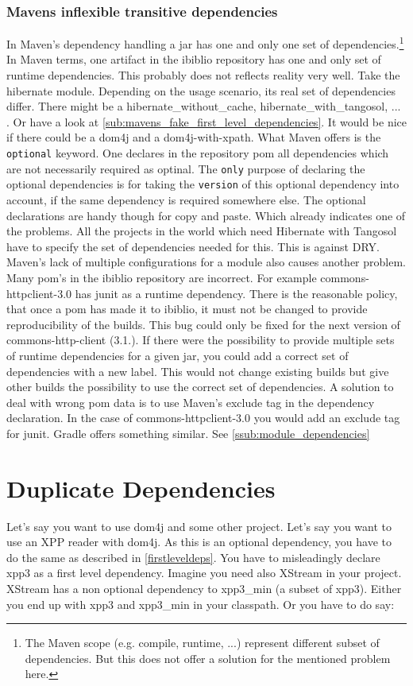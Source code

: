 \subsubsection{Mavens inflexible transitive dependencies}
In Maven’s dependency handling a jar has one and only one set of dependencies.\footnote{The Maven scope (e.g. compile, runtime, ...) represent different subset of dependencies. But this does not offer a solution for the mentioned problem here.} In Maven terms, one artifact in the ibiblio repository has one and only set of runtime dependencies. This probably does not reflects reality very well. Take the hibernate module. Depending on the usage scenario, its real set of dependencies differ. There might be a hibernate\_without\_cache, hibernate\_with\_tangosol, ... . Or have a look at \ref{sub:mavens_fake_first_level_dependencies}. It would be nice if there could be a dom4j and a dom4j-with-xpath. What Maven offers is the \texttt{optional} keyword. One declares in the repository pom all dependencies which are not necessarily required as optinal. The \texttt{only} purpose of declaring the optional dependencies is for taking the \texttt{version} of this optional dependency into account, if the same dependency is required somewhere else. The optional declarations are handy though for copy and paste. Which already indicates one of the problems. All the projects in the world which need Hibernate with Tangosol have to specify the set of dependencies needed for this. This is against DRY. 
Maven's lack of multiple configurations for a module also causes another problem. Many pom's in the ibiblio repository are incorrect. For example commons-httpclient-3.0 has junit as a runtime dependency. There is the reasonable policy, that once a pom has made it to ibiblio, it must not be changed to provide reproducibility of the builds. This bug could only be fixed for the next version of commons-http-client (3.1.). If there were the possibility to provide multiple sets of runtime dependencies for a given jar, you could add a correct set of dependencies with a new label. This would not change existing builds but give other builds the possibility to use the correct set of dependencies. A solution to deal with wrong pom data is to use Maven's exclude tag in the dependency declaration. In the case of commons-httpclient-3.0 you would add an exclude tag for junit. Gradle offers something similar. See \ref{ssub:module_dependencies}

\section{Duplicate Dependencies} %
\label{sec:duplicate_dependencies}
Let's say you want to use dom4j and some other project. Let's say you want to use an XPP reader with dom4j. As this is an optional dependency, you have to do the same as described in \ref{firstleveldeps}. You have to misleadingly declare xpp3 as a first level dependency. Imagine you need also XStream in your project. XStream has a non optional dependency to xpp3\_min (a subset of xpp3). Either you end up with xpp3 and xpp3\_min in your classpath. Or you have to do say:

